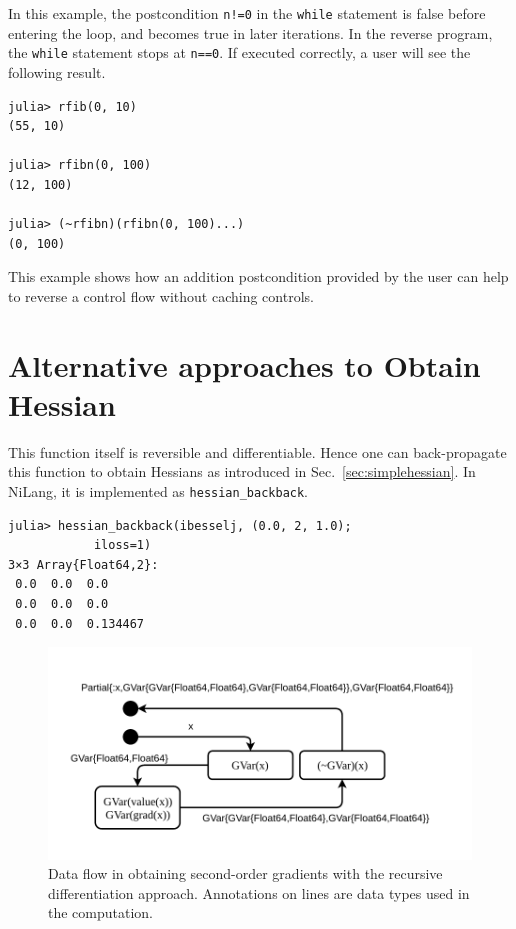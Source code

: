 \documentclass[aps,twocolumn,longbibliography,english,superscriptaddress]{revtex4-1}
\newcommand{\<}{\langle}
\renewcommand{\>}{\rangle}
\newcommand{\Sec}[1]{Sec.~\ref{#1}}
\theoremstyle{definition}\newtheorem{definition}{\textit{Definition}}
\begin{document}
In this example, the postcondition \texttt{n!=0} in the \texttt{while} statement is false before entering the loop, and becomes true in later iterations. In the reverse program, the \texttt{while} statement stops at \texttt{n==0}.
If executed correctly, a user will see the following result.

\begin{minipage}{.44\textwidth}
\begin{lstlisting}
julia> rfib(0, 10)
(55, 10)

julia> rfibn(0, 100)
(12, 100)

julia> (~rfibn)(rfibn(0, 100)...)
(0, 100)
\end{lstlisting}
\end{minipage}

This example shows how an addition postcondition provided by the user can help to reverse a control flow without caching controls.

\section{Alternative approaches to Obtain Hessian}\label{app:hessian}
This function itself is reversible and differentiable. Hence one can back-propagate this function to obtain Hessians as introduced in \Sec{sec:simplehessian}. In NiLang, it is implemented as \texttt{hessian\_backback}.

\begin{minipage}{.44\textwidth}
\begin{lstlisting}
julia> hessian_backback(ibesselj, (0.0, 2, 1.0);
            iloss=1)
3×3 Array{Float64,2}:
 0.0  0.0  0.0     
 0.0  0.0  0.0     
 0.0  0.0  0.134467
\end{lstlisting}
\end{minipage}

\begin{figure}[h]
    \centerline{\includegraphics[width=\columnwidth,trim={0 1cm 0cm 1cm},clip]{images/simplehessian.pdf}}
    \caption{Data flow in obtaining second-order gradients with the recursive differentiation approach. Annotations on lines are data types used in the computation.}\label{fig:simplehessian}
\end{figure}
\end{document}
